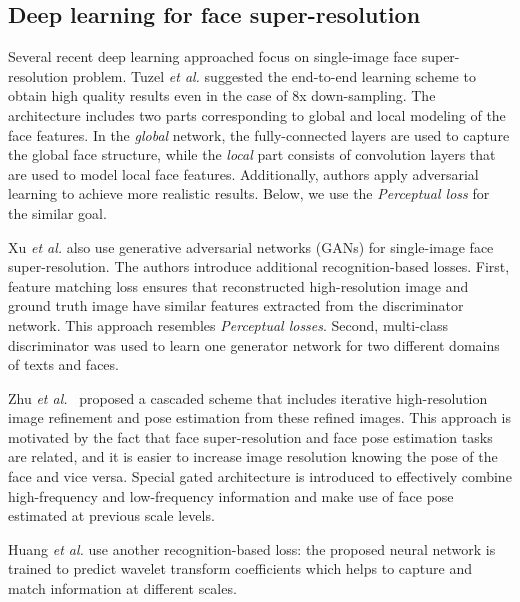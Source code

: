 \subsection{Deep learning for face super-resolution}

Several recent deep learning approached \cite{TuzelTH16,ZhuLLT16,xu2017learning,huang2017wavelet} focus on single-image face super-resolution problem.
Tuzel \emph{et al.} \cite{TuzelTH16} suggested the end-to-end learning scheme to obtain high quality results even in the case of 8x down-sampling. The architecture includes two parts corresponding to global and local modeling of the face features. In the \emph{global} network, the fully-connected layers are used to capture the global face structure, while the \emph{local} part consists of convolution layers that are used to model local face features. Additionally, authors apply adversarial learning to achieve more realistic results. 
Below, we use the \textit{Perceptual loss} for the similar goal.

Xu \emph{et al.} \cite{xu2017learning} also use generative adversarial networks (GANs) \cite{goodfellow2014generative} for single-image face super-resolution. The authors introduce additional recognition-based losses. First, feature matching loss ensures that reconstructed high-resolution image and ground truth image have similar features extracted from the discriminator network. This approach resembles \textit{Perceptual losses}.  Second, multi-class discriminator was used to learn one generator network for two different domains of texts and faces. %


Zhu \emph{et al.}~\cite{ZhuLLT16}  proposed a cascaded scheme that includes iterative high-resolution image refinement and pose estimation from these refined images. This approach is motivated by the fact that face super-resolution and face pose estimation tasks are related, and it is easier to increase image resolution knowing the pose of the face and vice versa. Special gated architecture is introduced to effectively combine high-frequency and low-frequency information and make use of face pose estimated at previous scale levels.

Huang \emph{et al.} \cite{huang2017wavelet} use another recognition-based loss: the proposed neural network is trained to predict wavelet transform coefficients which helps to capture and match information at different scales.


